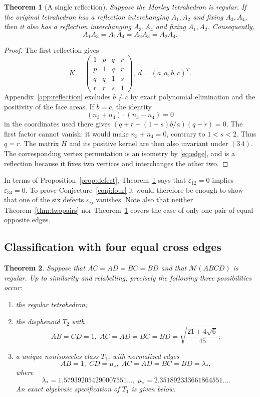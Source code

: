 \documentclass[11pt]{article}
\newtheorem{theorem}{Theorem}[section]
\theoremstyle{definition}
\theoremstyle{remark}
\newcommand{\M}{\mathcal M}
\begin{document}
\begin{theorem}[A single reflection]
\label{thm:reflection}
Suppose the Morley tetrahedron is regular. If the original tetrahedron has a reflection interchanging $A_1,A_2$ and fixing $A_3,A_4$, then it also has a reflection interchanging $A_3,A_4$ and fixing $A_1,A_2$. Consequently,
\[
A_1A_3=A_1A_4=A_2A_3=A_2A_4.
\]
\end{theorem}

\begin{proof}
The first reflection gives
\[
K=\begin{pmatrix}1&p&q&r\\p&1&q&r\\q&q&1&s\\r&r&s&1\end{pmatrix},
\; d=(a,a,b,c)^T.
\]
Appendix~\ref{app:reflection} excludes $b\ne c$ by exact polynomial elimination and the positivity of the face areas. If $b=c$, the identity
\[
(n_3+n_4)\cdot(n_3-n_4)=0
\]
in the coordinates used there gives $(q+r-(1+s)b/a)(q-r)=0$. The first factor cannot vanish: it would make $n_3+n_4=0$, contrary to $1<s<2$. Thus $q=r$. The matrix $H$ and its positive kernel are then also invariant under $(3\,4)$. The corresponding vertex permutation is an isometry by \eqref{eq:edge}, and is a reflection because it fixes two vertices and interchanges the other two.
\end{proof}

In terms of Proposition~\ref{prop:defect}, Theorem~\ref{thm:reflection} says that $\varepsilon_{12}=0$ implies $\varepsilon_{34}=0$. To prove Conjecture~\ref{conj:four} it would therefore be enough to show that one of the six defects $\varepsilon_{ij}$ vanishes. Note also that neither Theorem~\ref{thm:twopairs} nor Theorem~\ref{thm:reflection} covers the case of only one pair of equal opposite edges.

\subsection{Classification with four equal cross edges}\label{sym:section}

\begin{theorem}
\label{sym:thm:classification}
Suppose that $AC=AD=BC=BD$ and that $\M(ABCD)$ is regular.
Up to similarity and relabelling, precisely the following three
possibilities occur:
\begin{enumerate}
\item the regular tetrahedron;
\item the disphenoid $T_2$ with
\[
AB=CD=1,\;
AC=AD=BC=BD=\sqrt{\frac{21+4\sqrt6}{45}};
\]
\item a unique nonisosceles class $T_1$, with normalized edges
\[
AB=1,\; CD=\mu_*,\;
AC=AD=BC=BD=\lambda_*,
\]
where
\[
\lambda_*=1.579392054290007551\ldots,\;
\mu_*=2.351892333661864551\ldots.
\]
An exact algebraic specification of $T_1$ is given below.
\end{enumerate}
\end{theorem}
\end{document}
